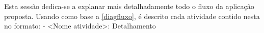 Esta sessão dedica-se a explanar mais detalhadamente todo o fluxo da aplicação proposta. Usando como base a \autoref{diagfluxo}, é descrito cada atividade contido nesta no formato: - <Nome atividade>: Detalhamento
